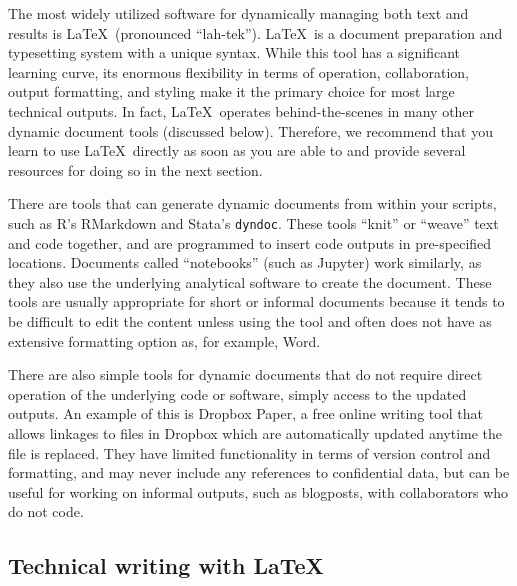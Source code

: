 The most widely utilized software
for dynamically managing both text and results is \LaTeX\ (pronounced ``lah-tek'').
\index{\LaTeX}
\LaTeX\ is a document preparation and typesetting system with a unique syntax.
While this tool has a significant learning curve,
its enormous flexibility in terms of operation, collaboration, output formatting, and styling
make it the primary choice for most large technical outputs.
In fact, \LaTeX\ operates behind-the-scenes in many other dynamic document tools (discussed below).
Therefore, we recommend that you learn to use \LaTeX\ directly
as soon as you are able to and provide several resources for doing so in the next section.

There are tools that can generate dynamic documents from within your scripts, 
such as R's RMarkdown
and Stata's \texttt{dyndoc}.
These tools ``knit'' or ``weave'' text and code together,
and are programmed to insert code outputs in pre-specified locations.
Documents called ``notebooks'' (such as Jupyter) work similarly,
as they also use the underlying analytical software to create the document.
These tools are usually appropriate for short or informal documents
because it tends to be difficult to edit the content unless using the tool 
and often does not have as extensive formatting option as, for example, Word.

There are also simple tools for dynamic documents
that do not require direct operation of the underlying code or software,
simply access to the updated outputs.
An example of this is Dropbox Paper,
a free online writing tool that allows linkages to files in Dropbox
which are automatically updated anytime the file is replaced.
They have limited functionality in terms of version control and formatting,
and may never include any references to confidential data,
but can be useful for working on informal outputs, such as blogposts,
with collaborators who do not code. 


\subsection{Technical writing with \LaTeX}

